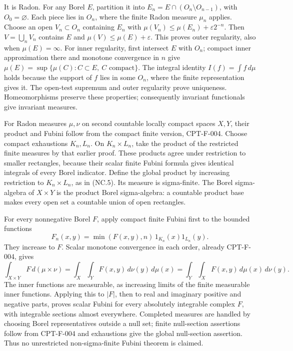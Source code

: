 \documentclass[
  11pt,
]{article}
\begin{document}
It is Radon. For any Borel \(E\), partition it into
\(E_n=E\cap(O_n\setminus O_{n-1})\), with \(O_0=\varnothing\). Each
piece lies in \(O_n\), where the finite Radon measure \(\mu_n\) applies.
Choose an open \(V_n\subset O_n\) containing \(E_n\) with
\(\mu(V_n)\leq\mu(E_n)+\varepsilon2^{-n}\). Then \(V=\bigcup_nV_n\)
contains \(E\) and \(\mu(V)\leq\mu(E)+\varepsilon\). This proves outer
regularity, also when \(\mu(E)=\infty\). For inner regularity, first
intersect \(E\) with \(O_n\); compact inner approximation there and
monotone convergence in \(n\) give
\(\mu(E)=\sup\{\mu(C):C\subset E,\ C\text{ compact}\}\). The integral
identity \(I(f)=\int f\,d\mu\) holds because the support of \(f\) lies
in some \(O_n\), where the finite representation gives it. The open-test
supremum and outer regularity prove uniqueness. Homeomorphisms preserve
these properties; consequently invariant functionals give invariant
measures.

For Radon measures \(\mu,\nu\) on second countable locally compact
spaces \(X,Y\), their product and Fubini follow from the compact finite
version, CPT-F-004. Choose compact exhaustions \(K_n,L_n\). On
\(K_n\times L_n\), take the product of the restricted finite measures by
that earlier proof. These products agree under restriction to smaller
rectangles, because their scalar finite Fubini formula gives identical
integrals of every Borel indicator. Define the global product by
increasing restriction to \(K_n\times L_n\), as in (NC.5). Its measure
is sigma-finite. The Borel sigma-algebra of \(X\times Y\) is the product
Borel sigma-algebra: a countable product base makes every open set a
countable union of open rectangles.

For every nonnegative Borel \(F\), apply compact finite Fubini first to
the bounded functions \[
 F_n(x,y)=\min(F(x,y),n)\,1_{K_n}(x)1_{L_n}(y).
\] They increase to \(F\). Scalar monotone convergence in each order,
already CPT-F-004, gives \[
 \int_{X\times Y}F\,d(\mu\times\nu)
 =\int_X\int_Y F(x,y)\,d\nu(y)\,d\mu(x)
 =\int_Y\int_X F(x,y)\,d\mu(x)\,d\nu(y).              \tag{NC.6}
\] The inner functions are measurable, as increasing limits of the
finite measurable inner functions. Applying this to \(|F|\), then to
real and imaginary positive and negative parts, proves scalar Fubini for
every absolutely integrable complex \(F\), with integrable sections
almost everywhere. Completed measures are handled by choosing Borel
representatives outside a null set; finite null-section assertions
follow from CPT-F-004 and exhaustions give the global null-section
assertion. Thus no unrestricted non-sigma-finite Fubini theorem is
claimed.
\end{document}

